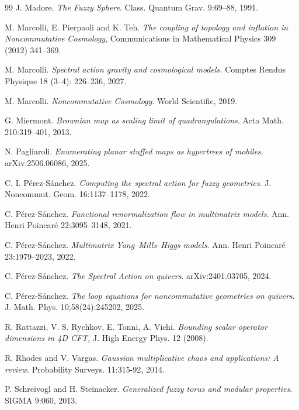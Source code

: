 \documentclass[11pt]{article}
\theoremstyle{plain}
\begin{document}
\begin{thebibliography}{99}
J. Madore. \emph{The Fuzzy Sphere}. Class. Quantum Grav. 9:69–88, 1991.



 M. Marcolli, E. Pierpaoli  and  K.  Teh. {\it The coupling of topology and inflation in Noncommutative Cosmology},  Communications in Mathematical Physics 309 (2012) 341–369.




 M. Marcolli.  {\it Spectral action gravity and cosmological models.} Comptes Rendus Physique 18 (3–4): 226–236, 2027. 




M. Marcolli. \emph{Noncommutative Cosmology}. World Scientific, 2019.





G. Miermont. \emph{Brownian map as scaling limit of quadrangulations}. Acta Math. 210:319–401, 2013.

N. Pagliaroli. \emph{Enumerating planar stuffed maps as hypertrees of mobiles}. arXiv:2506.06086, 2025.

C. I. Pérez-Sánchez. \emph{Computing the spectral action for fuzzy geometries}. J. Noncommut. Geom. 16:1137–1178, 2022.

C. Pérez-Sánchez. \emph{Functional renormalization flow in multimatrix models}. Ann. Henri Poincaré 22:3095–3148, 2021.

C. Pérez-Sánchez. \emph{Multimatrix Yang–Mills–Higgs models}. Ann. Henri Poincaré 23:1979–2023, 2022.

C. Pérez-Sánchez. \emph{The Spectral Action on quivers}. arXiv:2401.03705, 2024.

C. Pérez-Sánchez. \emph{The loop equations for noncommutative geometries on quivers}. J. Math. Phys. 10;58(24):245202, 2025.

R. Rattazzi, V. S. Rychkov, E. Tonni, A. Vichi. {\it  Bounding scalar operator dimensions in 4D CFT,} J. High Energy Phys. 12 (2008). 

R. Rhodes and V. Vargas. \emph{Gaussian multiplicative chaos and applications: A review}. Probability Surveys. 11:315-92, 2014.

P. Schreivogl and H. Steinacker.
\emph{Generalized fuzzy torus and modular properties}. SIGMA 9:060, 2013.








\end{thebibliography}
\end{document}
